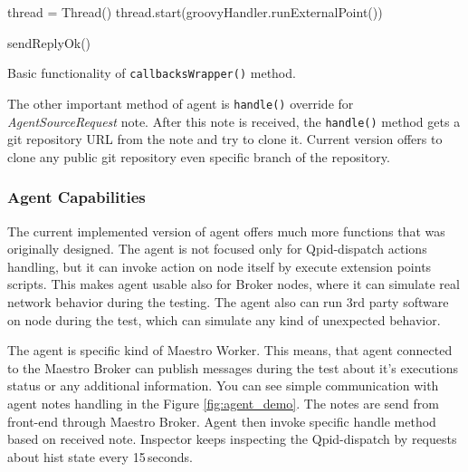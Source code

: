 \begin{center}
	\begin{algorithm}[H]
		\LinesNumbered
		\DontPrintSemicolon



		\var thread = Thread()\;
		thread.start(groovyHandler.runExternalPoint())\;

		sendReplyOk()\;

		 \caption{Basic functionality of \texttt{callbacksWrapper()} method. }
		 \label{alg:agent_note_handle}
	\end{algorithm}
\end{center}

The other important method of agent is \texttt{handle()} override for \emph{AgentSourceRequest} note. After this note is received, the \texttt{handle()} method gets a git repository URL from the note and try to clone it. Current version offers to clone any public git repository even specific branch of the repository.

\subsubsection*{Agent Capabilities}
\label{Agent Capabilities}
The current implemented version of agent offers much more functions that was originally designed. The agent is not focused only for Qpid-dispatch actions handling, but it can invoke action on node itself by execute extension points scripts. This makes agent usable also for Broker nodes, where it can simulate real network behavior during the testing. The agent also can run 3rd party software on node during the test, which can simulate any kind of unexpected behavior.

The agent is specific kind of Maestro Worker. This means, that agent connected to the Maestro Broker can publish messages during the test about it's executions status or any additional information. You can see simple communication with agent notes handling in the Figure \ref{fig:agent_demo}. The notes are send from front-end through Maestro Broker. Agent then invoke specific handle method based on received note. Inspector keeps inspecting the Qpid-dispatch by requests about hist state every 15\,seconds.

